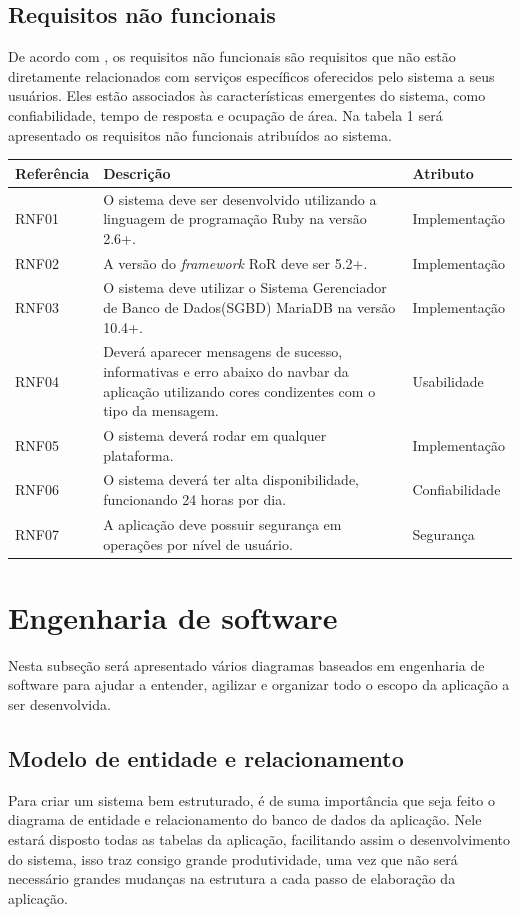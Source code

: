 \subsection{Requisitos não funcionais}
De acordo com \cite{sommerville2007engenharia}, os requisitos não funcionais são requisitos que não estão diretamente relacionados com serviços específicos oferecidos pelo sistema a seus usuários. Eles estão associados às características emergentes do sistema, como confiabilidade, tempo de resposta e ocupação de área. Na tabela 1 será apresentado os requisitos não funcionais atribuídos ao sistema.

\begin{tabularx}{0.9\textwidth} { 
  | >{\raggedright\arraybackslash}X 
  | >{\raggedright\arraybackslash}X 
  | >{\raggedright\arraybackslash}X | }
 \hline
 Referência & Descrição & Atributo \\
 \hline
 RNF01 & O sistema deve ser desenvolvido utilizando a linguagem de programação Ruby na versão 2.6+. & Implementação  \\
 \hline
 RNF02 & A versão do \textit{framework} RoR deve ser 5.2+. & Implementação  \\
 \hline
 RNF03 & O sistema deve utilizar o Sistema Gerenciador de Banco de Dados(SGBD) MariaDB na versão 10.4+. & Implementação  \\
 \hline
 RNF04 & Deverá aparecer mensagens de sucesso, informativas e erro abaixo do navbar da aplicação utilizando cores condizentes com o tipo da mensagem. & Usabilidade  \\
 \hline
 RNF05 & O sistema deverá rodar em qualquer plataforma. & Implementação  \\
 \hline
 RNF06 & O sistema deverá ter alta disponibilidade, funcionando 24 horas por dia. & Confiabilidade  \\
 \hline
 RNF07 & A aplicação deve possuir segurança em operações por nível de usuário. & Segurança  \\
 \hline
\end{tabularx}

\section{Engenharia de software}
Nesta subseção será apresentado vários diagramas baseados em engenharia de software para ajudar a entender, agilizar e organizar todo o escopo da aplicação a ser desenvolvida.

\subsection{Modelo de entidade e relacionamento}
Para criar um sistema bem estruturado, é de suma importância que seja feito o diagrama de entidade e relacionamento do banco de dados da aplicação. Nele estará disposto todas as tabelas da aplicação, facilitando assim o desenvolvimento do sistema, isso traz consigo grande produtividade, uma vez que não será necessário grandes mudanças na estrutura a cada passo de elaboração da aplicação.

